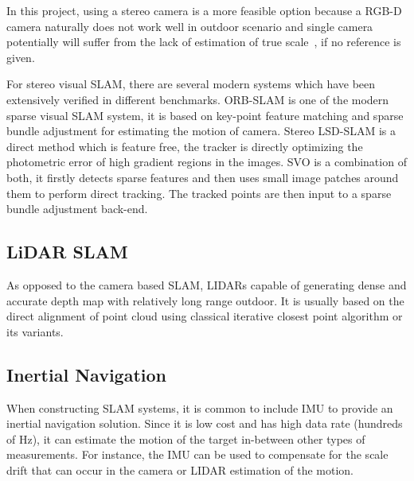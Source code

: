 In this project, using a stereo camera is a more feasible option
because a RGB-D camera naturally does not work well in outdoor scenario
and single camera potentially will suffer from the lack of estimation
of true scale~\cite{Royer2007}, if no reference is given.

For stereo visual \gls{SLAM}, there are several modern systems
which have been extensively verified in different
benchmarks. \gls{ORB}-\gls{SLAM}\cite{DBLP:journals/corr/Mur-ArtalT16a} is one
of the modern sparse visual \gls{SLAM}
system, it is based on key-point feature matching and sparse bundle
adjustment for estimating the motion of camera. Stereo \gls{LSD}-\gls{SLAM}\cite{7353631} is
a direct method which is feature free, the tracker is directly
optimizing the photometric error of  high gradient regions in the
images. \gls{SVO}\cite{7782863} is a combination of both, it firstly detects sparse
features and then uses small image patches around them to perform
direct tracking. The tracked points are then input to a sparse bundle
adjustment back-end.

\subsection{LiDAR SLAM}

As opposed to the camera based \gls{SLAM}, \gls{LIDAR}s capable
of generating dense and accurate depth map with relatively long range
outdoor\cite{7487258}. It is usually based on the direct alignment of point cloud
using classical iterative closest point algorithm or its variants.

\subsection{Inertial Navigation}

When constructing \gls{SLAM} systems, it is common to include \gls{IMU} to
provide an inertial navigation solution. Since it is low
cost and has high data rate (hundreds of Hz), it can estimate the motion of the
target in-between other types of measurements. For instance, the \gls{IMU} can
be used to compensate for the scale drift that can occur in the camera or
\gls{LIDAR} estimation of the motion.




